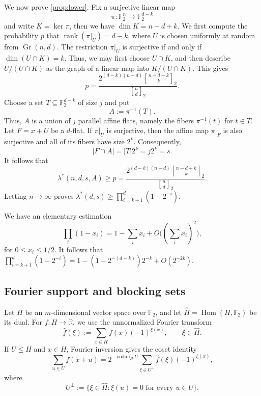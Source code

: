 \documentclass[10pt,a4paper]{amsart}
\newcommand{\F}{\mathbb F}
\newcommand{\R}{\mathbb R}
\renewcommand{\P}{\mathbb P}
\newcommand{\qbinom}[2]{\genfrac{[}{]}{0pt}{}{#1}{#2}_{\!2}}
\DeclareMathOperator{\Gr}{Gr}
\DeclareMathOperator{\codim}{codim}
\DeclareMathOperator{\rank}{rank}
\begin{document}
We now prove \cref{prop:lower}.
Fix a surjective linear map
\[
  \pi:\F_2^n\longrightarrow\F_2^{d-k}
\]
and write $K=\ker \pi$, then we have $\dim K=n-d+k$. We first compute the probability $p$ that $\rank(\pi|_U)=d-k$, where $U$ is chosen uniformly at random from $\Gr(n,d)$. The restriction $\pi|_U$ is surjective if and only if $\dim(U\cap K)=k$. Thus, we may first choose
$U\cap K$, and then describe $U/(U\cap K)$ as the graph of a linear
map into $K/(U\cap K)$. This gives
\begin{equation}\label{eq:finite-rank-probability}
  p
  =\frac{2^{(d-k)(n-d)}\qbinom{n-d+k}{k}}{\qbinom{n}{d}}.
\end{equation}
Choose a set $T\subseteq\F_2^{d-k}$ of size $j$ and put
\[
  A:=\pi^{-1}(T).
\]
Thus, $A$ is a union of $j$ parallel affine flats, namely the fibers
$\pi^{-1}(t)$ for $t\in T$.  Let
$F=x+U$ be a $d$-flat. If $\pi|_U$ is surjective, then the affine map
$\pi|_F$ is also surjective and all of its fibers have size $2^k$.
Consequently,
\[
  |F\cap A|=|T|2^k=j2^k=s.
\]
It follows that
\[\lambda^*(n,d,s,A)\ge p
  =\frac{2^{(d-k)(n-d)}\qbinom{n-d+k}{k}}{\qbinom{n}{d}}.\]  
Letting $n\to\infty$ proves $\lambda^*(d,s)\ge \prod_{i = k+1}^d(1-2^{-i})$.

We have an elementary estimation
\[
\prod_i(1-x_i)=1-\sum_i x_i+O\biggl(\left(\sum_i x_i\right)^2\biggr),
\]
for $0\le x_i\le1/2$. It follows that $\prod_{i = k+1}^d(1-2^{-i}) = 1- (1-2^{-(d-k)})2^{-k} + O(2^{-2k})$. 


\subsection{Fourier support and blocking sets}

Let $H$ be an $m$-dimensional vector space over $\F_2$, and let
$\widehat H=\operatorname{Hom}(H,\F_2)$ be its dual.  For
$f:H\to\R$, we use the unnormalized Fourier transform
\[
  \widehat f(\xi):=\sum_{x\in H}f(x)(-1)^{\xi(x)},
  \qquad \xi\in\widehat H.
\]
If $U\le H$ and $x\in H$, Fourier inversion gives the coset identity
\begin{equation}\label{eq:coset-fourier}
  \sum_{u\in U}f(x+u)
  =2^{-\codim_H U}
    \sum_{\xi\in U^\perp}\widehat f(\xi)(-1)^{\xi(x)},
\end{equation}
where
\[
  U^\perp:=\{\xi\in\widehat H:\xi(u)=0\text{ for every }u\in U\}.
\]
\end{document}
